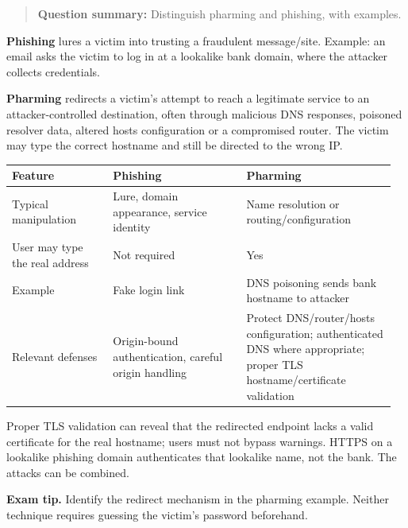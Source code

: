 \documentclass[11pt,a4paper]{article}
\begin{document}
\begin{quote}\small

\textbf{Question summary:} Distinguish pharming and phishing,\allowbreak{} with examples.



\end{quote}

\textbf{Phishing} lures a victim into trusting a fraudulent message/\allowbreak{}site. Example: an email asks the victim to log in at a lookalike bank domain,\allowbreak{} where the attacker collects credentials.


\textbf{Pharming} redirects a victim’s attempt to reach a legitimate service to an attacker-controlled destination,\allowbreak{} often through malicious DNS responses,\allowbreak{} poisoned resolver data,\allowbreak{} altered hosts configuration or a compromised router. The victim may type the correct hostname and still be directed to the wrong IP.



{\small\setlength{\tabcolsep}{3pt}
\begin{longtable}{>{\raggedright\arraybackslash}p{0.25298\linewidth}>{\raggedright\arraybackslash}p{0.33306\linewidth}>{\raggedright\arraybackslash}p{0.37238\linewidth}}
\toprule
\textbf{Feature} & \textbf{Phishing} & \textbf{Pharming} \\
\midrule
\endhead
Typical manipulation & Lure,\allowbreak{} domain appearance,\allowbreak{} service identity & Name resolution or routing/\allowbreak{}configuration \\
User may type the real address & Not required & Yes \\
Example & Fake login link & DNS poisoning sends bank hostname to attacker \\
Relevant defenses & Origin-bound authentication,\allowbreak{} careful origin handling & Protect DNS/\allowbreak{}router/\allowbreak{}hosts configuration; authenticated DNS where appropriate; proper TLS hostname/\allowbreak{}certificate validation \\
\bottomrule
\end{longtable}
}

Proper TLS validation can reveal that the redirected endpoint lacks a valid certificate for the real hostname; users must not bypass warnings. HTTPS on a lookalike phishing domain authenticates that lookalike name,\allowbreak{} not the bank. The attacks can be combined.



{\color{ForestGreen}\textbf{Exam tip.} Identify the redirect mechanism in the pharming example. Neither technique requires guessing the victim’s password beforehand.}
\end{document}
